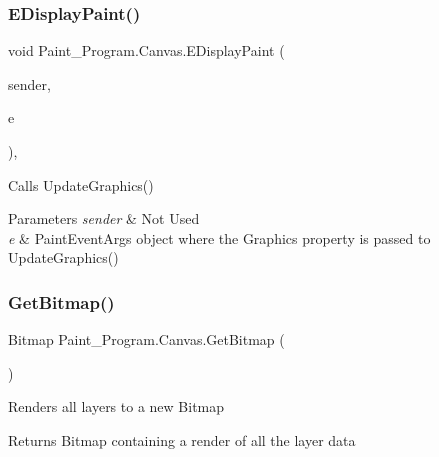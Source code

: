 \subsubsection{\texorpdfstring{E\+Display\+Paint()}{EDisplayPaint()}}
{\footnotesize\ttfamily void Paint\+\_\+\+Program.\+Canvas.\+E\+Display\+Paint (\begin{DoxyParamCaption}\item[{object}]{sender,  }\item[{Paint\+Event\+Args}]{e }\end{DoxyParamCaption})\hspace{0.3cm}{\ttfamily [inline]}, {\ttfamily [private]}}



Calls Update\+Graphics() 


\begin{DoxyParams}{Parameters}
{\em sender} & Not Used\\
\hline
{\em e} & Paint\+Event\+Args object where the Graphics property is passed to Update\+Graphics()\\
\hline
\end{DoxyParams}
\mbox{\label{class_paint___program_1_1_canvas_a1dad48a553831296e7920219e8614a6f}} 
\subsubsection{\texorpdfstring{Get\+Bitmap()}{GetBitmap()}}
{\footnotesize\ttfamily Bitmap Paint\+\_\+\+Program.\+Canvas.\+Get\+Bitmap (\begin{DoxyParamCaption}{ }\end{DoxyParamCaption})\hspace{0.3cm}{\ttfamily [inline]}}



Renders all layers to a new Bitmap 

\begin{DoxyReturn}{Returns}
Bitmap containing a render of all the layer data
\end{DoxyReturn}
\mbox{\label{class_paint___program_1_1_canvas_a08e5d5aa35c75a7e6c64db752a79df8e}} 

